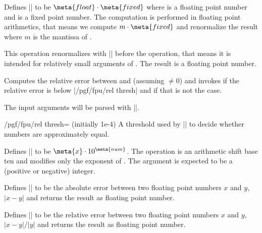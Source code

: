 \begin{command}{\pgfmathfloatmultiplyfixed{}}
  Defines |\pgfmathresult| to be $\meta{float} \cdot \meta{fixed}$
  where  is a floating point number and  is a
  fixed point number. The computation is performed in floating point
  arithmetics, that means we compute $m \cdot \meta{fixed}$ and
  renormalize the result where $m$ is the mantissa of . 

  This operation renormalizes  with
  |\pgfmathfloattoextentedprecision| before the operation, that means
  it is intended for relatively small arguments of . The
  result is a floating point number. 
\end{command}

\begin{command}{\pgfmathfloatifapproxequalrel{}}
  Computes the relative error between  and  (assuming
  $\neq 0$) and invokes  if the relative error
  is below |/pgf/fpu/rel thresh| and  if that is not
  the case. 

  The input arguments will be parsed with |\pgfmathfloatparsenumber|.

  \begin{key}{/pgf/fpu/rel thresh= (initially 1e-4)}
    A threshold used by |\pgfmathfloatifapproxequalrel| to decide
    whether numbers are approximately equal. 
  \end{key}
\end{command}


\begin{command}{}
  Defines |\pgfmathresult| to be $\meta{x} \cdot 10^{\meta{num}}$. The
  operation is an arithmetic shift base ten and modifies only the
  exponent of . The argument  is expected to be a
  (positive or negative) integer. 
\end{command}


\begin{command}{\pgfmathfloatabserror{}}
  Defines |\pgfmathresult| to be the absolute error between two
  floating point numbers $x$ and $y$, $\lvert x - y\rvert $ and
  returns the result as floating point number. 
\end{command}

\begin{command}{\pgfmathfloatrelerror{}}
  Defines |\pgfmathresult| to be the relative error between two
  floating point numbers $x$ and $y$, $\lvert x - y\rvert / \lvert y
  \rvert $ and returns the result as floating point number. 
\end{command}


